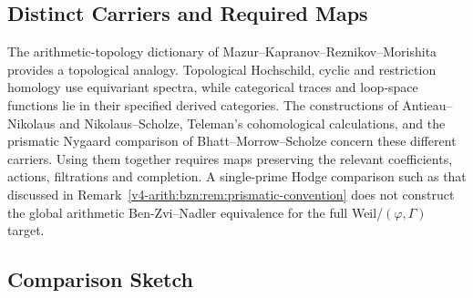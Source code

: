 \subsection{Distinct Carriers and Required Maps}

\begin{remark}
\label{v4-arith:bzn:prop:disjoint}
The arithmetic-topology dictionary of Mazur--Kapranov--Reznikov--Morishita
provides a topological analogy. Topological Hochschild, cyclic and
restriction homology use equivariant spectra, while categorical traces
and loop-space functions lie in their specified derived categories.
The constructions of Antieau--Nikolaus and Nikolaus--Scholze,
Teleman's cohomological calculations, and the prismatic Nygaard
comparison of Bhatt--Morrow--Scholze concern these different carriers.
Using them together requires maps preserving the relevant coefficients,
actions, filtrations and completion. A single-prime Hodge comparison
such as that discussed in
Remark~\ref{v4-arith:bzn:rem:prismatic-convention}
does not construct the global arithmetic Ben-Zvi--Nadler equivalence
for the full Weil/\((\varphi,\Gamma)\) target.
\end{remark}

\subsection{Comparison Sketch}


